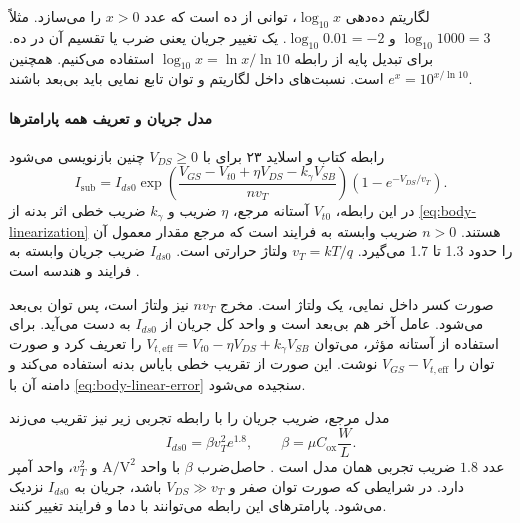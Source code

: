 لگاریتم ده‌دهی \(\log_{10}x\)، توانی از ده است که عدد \(x>0\) را
می‌سازد. مثلاً \(\log_{10}1000=3\) و \(\log_{10}0.01=-2\).
یک  تغییر جریان یعنی ضرب یا تقسیم آن در ده.
برای تبدیل پایه از رابطه \(\log_{10}x=\ln x/\ln10\) استفاده می‌کنیم.
همچنین \(e^x=10^{x/\ln10}\) است. نسبت‌های داخل لگاریتم و توان تابع
نمایی باید بی‌بعد باشند.

\paragraph*{مدل جریان و تعریف همه پارامترها}
رابطه  کتاب و اسلاید ۲۳ برای  با
\(V_{DS}\ge0\) چنین بازنویسی می‌شود
\begin{equation}
 I_{\mathrm{sub}}=I_{ds0}
 \exp\!\left(\frac{V_{GS}-V_{t0}+\eta V_{DS}-k_\gamma V_{SB}}{nv_T}\right)
 \left(1-e^{-V_{DS}/v_T}\right).
 \label{eq:leakage-subthreshold-model}
\end{equation}
در این رابطه، \(V_{t0}\) آستانه مرجع، \(\eta\) ضریب  و
\(k_\gamma\) ضریب خطی اثر بدنه از
\eqref{eq:body-linearization} هستند. \(n>0\) ضریب وابسته به فرایند
است که مرجع مقدار معمول آن را حدود \num{1.3} تا \num{1.7} می‌گیرد.
\(v_T=kT/q\) ولتاژ حرارتی است. \(I_{ds0}\) ضریب جریان وابسته به
فرایند و هندسه است \cite[صفحات ۸۱ و ۸۲]{weste}.

صورت کسر داخل نمایی، یک ولتاژ است. مخرج \(nv_T\) نیز ولتاژ است، پس
توان بی‌بعد می‌شود. عامل آخر هم بی‌بعد است و واحد کل جریان از
\(I_{ds0}\) به دست می‌آید. برای استفاده از آستانه مؤثر، می‌توان
\(V_{t,\mathrm{eff}}=V_{t0}-\eta V_{DS}+k_\gamma V_{SB}\) را تعریف کرد
و صورت توان را \(V_{GS}-V_{t,\mathrm{eff}}\) نوشت.
این صورت از تقریب خطی بایاس بدنه استفاده می‌کند و دامنه آن با
\eqref{eq:body-linear-error} سنجیده می‌شود.

مدل مرجع، ضریب جریان را با رابطه تجربی زیر نیز تقریب می‌زند
\begin{equation}
 I_{ds0}=\beta v_T^2e^{1.8},\qquad
 \beta=\mu C_{\mathrm{ox}}\frac{W}{L}.
 \label{eq:leakage-current-prefactor}
\end{equation}
عدد \(1.8\) ضریب تجربی همان مدل است
\cite[رابطه ]{weste}. حاصل‌ضرب
\(\beta\) با واحد \(\unit{\ampere\per\volt\squared}\) و \(v_T^2\)،
واحد آمپر دارد. در شرایطی که صورت توان صفر و
\(V_{DS}\gg v_T\) باشد، جریان به \(I_{ds0}\) نزدیک می‌شود.
پارامترهای این رابطه می‌توانند با دما و فرایند تغییر کنند.

